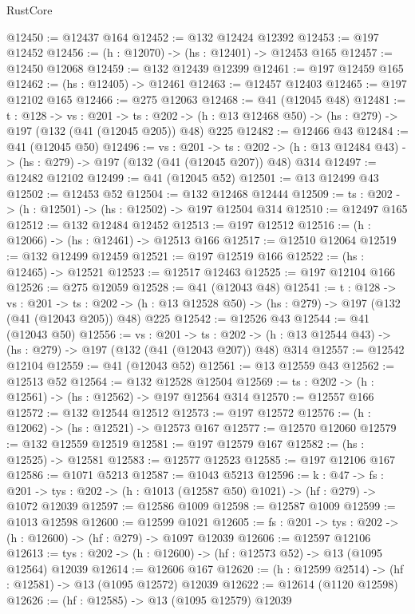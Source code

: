 \begin{lexlean}{RustCore}
\begin{coremodule}
@12450 := @12437 @164
@12452 := @132 @12424 @12392
@12453 := @197 @12452
@12456 := (h : @12070) -> (hs : @12401) -> @12453 @165
@12457 := @12450 @12068
@12459 := @132 @12439 @12399
@12461 := @197 @12459 @165
@12462 := (hs : @12405) -> @12461
@12463 := @12457 @12403
@12465 := @197 @12102 @165
@12466 := @275 @12063
@12468 := @41 (@12045 @48)
@12481 := {t : @128} ->
  {vs : @201} ->
  {ts : @202} -> (h : @13 @12468 @50) -> (hs : @279) -> @197 (@132 (@41 (@12045 @205)) @48) @225
@12482 := @12466 @43
@12484 := @41 (@12045 @50)
@12496 := {vs : @201} ->
  {ts : @202} -> (h : @13 @12484 @43) -> (hs : @279) -> @197 (@132 (@41 (@12045 @207)) @48) @314
@12497 := @12482 @12102
@12499 := @41 (@12045 @52)
@12501 := @13 @12499 @43
@12502 := @12453 @52
@12504 := @132 @12468 @12444
@12509 := {ts : @202} -> (h : @12501) -> (hs : @12502) -> @197 @12504 @314
@12510 := @12497 @165
@12512 := @132 @12484 @12452
@12513 := @197 @12512
@12516 := (h : @12066) -> (hs : @12461) -> @12513 @166
@12517 := @12510 @12064
@12519 := @132 @12499 @12459
@12521 := @197 @12519 @166
@12522 := (hs : @12465) -> @12521
@12523 := @12517 @12463
@12525 := @197 @12104 @166
@12526 := @275 @12059
@12528 := @41 (@12043 @48)
@12541 := {t : @128} ->
  {vs : @201} ->
  {ts : @202} -> (h : @13 @12528 @50) -> (hs : @279) -> @197 (@132 (@41 (@12043 @205)) @48) @225
@12542 := @12526 @43
@12544 := @41 (@12043 @50)
@12556 := {vs : @201} ->
  {ts : @202} -> (h : @13 @12544 @43) -> (hs : @279) -> @197 (@132 (@41 (@12043 @207)) @48) @314
@12557 := @12542 @12104
@12559 := @41 (@12043 @52)
@12561 := @13 @12559 @43
@12562 := @12513 @52
@12564 := @132 @12528 @12504
@12569 := {ts : @202} -> (h : @12561) -> (hs : @12562) -> @197 @12564 @314
@12570 := @12557 @166
@12572 := @132 @12544 @12512
@12573 := @197 @12572
@12576 := (h : @12062) -> (hs : @12521) -> @12573 @167
@12577 := @12570 @12060
@12579 := @132 @12559 @12519
@12581 := @197 @12579 @167
@12582 := (hs : @12525) -> @12581
@12583 := @12577 @12523
@12585 := @197 @12106 @167
@12586 := @1071 @5213
@12587 := @1043 @5213
@12596 := {k : @47} ->
  {fs : @201} -> {tys : @202} -> (h : @1013 (@12587 @50) @1021) -> (hf : @279) -> @1072 @12039
@12597 := @12586 @1009
@12598 := @12587 @1009
@12599 := @1013 @12598
@12600 := @12599 @1021
@12605 := {fs : @201} -> {tys : @202} -> (h : @12600) -> (hf : @279) -> @1097 @12039
@12606 := @12597 @12106
@12613 := {tys : @202} -> (h : @12600) -> (hf : @12573 @52) -> @13 (@1095 @12564) @12039
@12614 := @12606 @167
@12620 := (h : @12599 @2514) -> (hf : @12581) -> @13 (@1095 @12572) @12039
@12622 := @12614 (@1120 @12598)
@12626 := (hf : @12585) -> @13 (@1095 @12579) @12039

\end{coremodule}
\end{lexlean}
